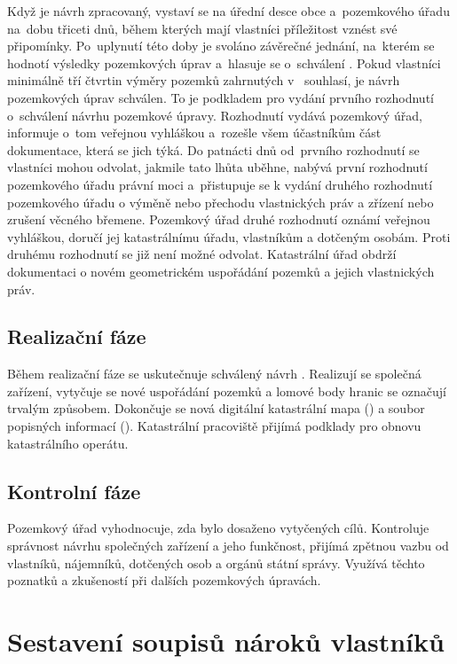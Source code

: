 Když je návrh zpracovaný, vystaví se na úřední desce obce a~pozemkového úřadu na~dobu třiceti dnů, během kterých mají vlastníci příležitost vznést své připomínky. Po~uplynutí této doby je svoláno závěrečné jednání, na~kterém se hodnotí výsledky pozemkových úprav a~hlasuje se o~schválení . Pokud vlastníci minimálně tří čtvrtin výměry pozemků zahrnutých v~ souhlasí, je návrh pozemkových úprav schválen. To je podkladem pro vydání prvního rozhodnutí o~schválení návrhu pozemkové úpravy. Rozhodnutí vydává pozemkový úřad, informuje o~tom veřejnou vyhláškou a~rozešle všem účastníkům část dokumentace, která se jich týká. Do patnácti dnů od~prvního rozhodnutí se vlastníci mohou odvolat, jakmile tato lhůta uběhne, nabývá první rozhodnutí pozemkového úřadu právní moci a~přistupuje se k vydání druhého rozhodnutí pozemkového úřadu o výměně nebo přechodu vlastnických práv a zřízení nebo zrušení věcného břemene. Pozemkový úřad druhé rozhodnutí oznámí veřejnou vyhláškou, doručí jej katastrálnímu úřadu, vlastníkům a dotčeným osobám. Proti druhému rozhodnutí se již není možné odvolat. Katastrální úřad obdrží dokumentaci o novém geometrickém uspořádání pozemků a jejich vlastnických práv.

\subsection{Realizační fáze}
\label{realizacni_faze}

Během realizační fáze se uskutečnuje schválený návrh . Realizují se společná zařízení, vytyčuje se nové uspořádání pozemků a lomové body hranic se označují trvalým způsobem. Dokončuje se nová digitální katastrální mapa () a soubor popisných informací (). Katastrální pracoviště přijímá podklady pro obnovu katastrálního operátu.

\subsection{Kontrolní fáze}
\label{kontrolni_faze}

Pozemkový úřad vyhodnocuje, zda bylo dosaženo vytyčených cílů. Kontroluje správnost návrhu společných zařízení a jeho funkčnost, přijímá zpětnou vazbu od vlastníků, nájemníků, dotčených osob a orgánů státní správy. Využívá těchto poznatků a zkušeností při dalších pozemkových úpravách.

\section{Sestavení soupisů nároků vlastníků}
\label{naroky}


